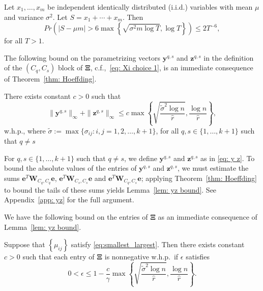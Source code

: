 \documentclass[twoside,11pt]{article}
\newcommand{\e}{\bs {e}}
\newcommand{\bs}{\boldsymbol}
\newcommand{\y}{\bs {y}}
\newcommand{\W}{\bs {W}}
\newcommand{\z}{\bs{z}}
\newcommand{\0}{\bs{0}}
\newcommand{\rbra}[1]{\ensuremath{\left( #1 \right)}} %
\newcommand{\bra}[1]{\ensuremath{\left\{ #1 \right\}}} %
\newcommand{\iid}{independent identically distributed (i.i.d.) }
\begin{document}
{\begin{theorem}
	\label{thm: Hoeffding}
	Let $x_1, \dots, x_m$ be \iid variables with mean $\mu$
	and variance $\sigma^2$.
	Let $S = x_1 + \cdots + x_m$. Then
	\begin{equation}
	\label{eq:hoeffding}
	Pr\rbra{ |S - \mu m| > 6 \max \bra{\sqrt{\sigma^2 m \log T}, \log T  }}
	 \le 2 T^{-6},
	\end{equation}
	for all $T > 1$.
\end{theorem}

The following bound
on the parametrizing vectors \(\y^{q,s}\) and \(\z^{q,s}\) in the definition of the \((C_q, C_s)\) block of \(\bs\Xi\), c.f.,~\eqref{eq: Xi choice 1},
is an immediate consequence of Theorem~\ref{thm: Hoeffding}.

\begin{lemma}
	\label{lem: yz bound}
	There exists constant $c > 0$ such that
	\begin{equation} \label{eq: yz bound}
		\|\bs{y}^{q,s}\|_{\infty} +  \|\bs{z}^{q,s}\|_{\infty} \leq
		c \max \bra{ \sqrt{ \frac{\tilde \sigma^2 \log n}{\hat r}} ,
			\frac{\log n}{\hat r} },
	\end{equation}
	w.h.p.,
	where $\tilde \sigma := \max \{ \sigma_{ij} : i,j = 1,2,\dots, k+1 \}$,
	for all \(q,s \in \{1,\dots, k+1\}\) such that 	$q \neq s$
\end{lemma}

For \(q,s \in \{1,\dots, k+1\}\) such that \(q \neq s\), we define \(\y^{q,s}\) and \(\z^{q,s}\) as in \eqref{eq: y z}. To bound
the absolute values of the entries of \(\y^{q,s}\) and \(\z^{q,s}\), we must estimate the sums \(\e^T \W_{C_q, C_q} \e\),
\(\e^T \W_{C_s, C_s} \e \) and \(\e^T \W_{C_q, C_s} \e \); applying Theorem~\ref{thm: Hoeffding} to bound the tails
of these sums yields Lemma~\ref{lem: yz bound}. See Appendix~\ref{app: yz} for the full argument.

We have the following bound on the entries of \(\bs \Xi\) as an immediate consequence of  Lemma~\ref{lem: yz bound}.

\begin{proposition}
	\label{thm: Xi bound}
	Suppose that $\bra{\mu_{ij}}$ satisfy \eqref{eq:smallest_largest}.
	Then there exists constant $c>0$ such that each entry of $\bs{\Xi}$ is nonnegative w.h.p.~if \(\epsilon\) 	satisfies
	\begin{equation} \label{eq: xi eps}
	0 < \epsilon \leq
		1 - \frac{c}{\gamma}\max \bra{ \sqrt{ \frac{\tilde \sigma^2 \log n}{\hat r}} ,
			\frac{\log n}{\hat r}  }.
	\end{equation}
\end{proposition}

}
\end{document}
